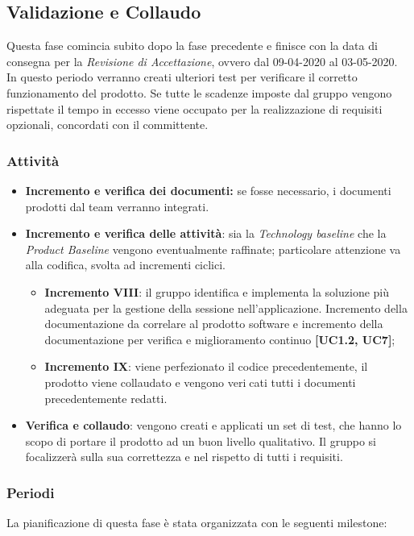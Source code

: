 \subsection{Validazione e Collaudo}
Questa fase comincia subito dopo la fase precedente e finisce con la data di consegna per la \textit{Revisione di Accettazione}, ovvero dal 09-04-2020 al 03-05-2020.\\
In questo periodo verranno creati ulteriori test per verificare il corretto funzionamento del prodotto. Se tutte le scadenze imposte dal gruppo vengono rispettate il tempo in eccesso viene occupato per la realizzazione di requisiti opzionali, concordati con il committente. 
\subsubsection{Attività}
\begin{itemize}
\item \textbf{Incremento e verifica dei documenti:} se fosse necessario, i documenti prodotti dal team verranno integrati.

 \item \textbf{Incremento e verifica delle attività}: sia la \textit{Technology baseline} che la \textit{Product Baseline} vengono eventualmente raffinate; particolare attenzione va alla codifica, svolta ad incrementi ciclici.
 \begin{itemize}
 \item \textbf{Incremento VIII}: il gruppo identifica e implementa la soluzione più adeguata per la gestione della sessione nell'applicazione. Incremento della documentazione da correlare al prodotto software e incremento della documentazione per verifica e miglioramento continuo \textbf{[UC1.2, UC7]};
\item \textbf{Incremento IX}: viene perfezionato il codice precedentemente, il prodotto viene collaudato e vengono vericati tutti i documenti precedentemente redatti. 
 \end{itemize}

 \item \textbf{Verifica e collaudo}: vengono creati e applicati un set di test, che hanno lo scopo di portare il prodotto ad un buon livello qualitativo. Il gruppo si focalizzerà sulla sua correttezza e nel rispetto di tutti i requisiti.
\end{itemize}

\subsubsection{Periodi}
La pianificazione di questa fase è stata organizzata con le seguenti milestone:

